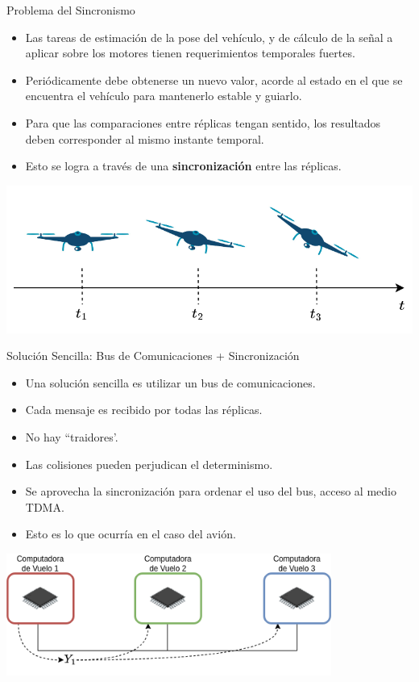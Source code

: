 \begin{frame}{Problema del Sincronismo}
	\begin{itemize}
		\item Las tareas de estimación de la pose del vehículo, y de cálculo de la señal a aplicar sobre los motores tienen requerimientos temporales fuertes.
		\item Periódicamente debe obtenerse un nuevo valor, acorde al estado en el que se encuentra el vehículo para mantenerlo estable y guiarlo.
		\item Para que las comparaciones entre réplicas tengan sentido, los resultados deben corresponder al mismo instante temporal.
		\item Esto se logra a través de una \textbf{sincronización} entre las réplicas.
	\end{itemize}
	\begin{center}
		\includegraphics[width=\textwidth]{img/estados_drones.png}
	\end{center}
\end{frame}

\begin{frame}{Solución Sencilla: Bus de Comunicaciones + Sincronización}
	\begin{itemize}
		\item Una solución sencilla es utilizar un bus de comunicaciones.
		\item Cada mensaje es recibido por todas las réplicas.
		\item No hay ``traidores'.
		\item Las colisiones pueden perjudican el determinismo.
		\item Se aprovecha la sincronización para ordenar el uso del bus, acceso al medio TDMA.
		\item Esto es lo que ocurría en el caso del avión.
	\end{itemize}
	\begin{center}
		\includegraphics[width=0.8\textwidth]{img/redundancia_bus.png}
	\end{center}
\end{frame}

